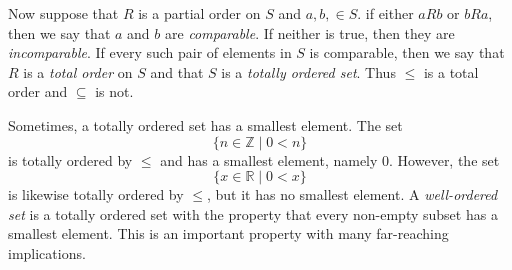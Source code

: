 \documentclass[12pt, letterpaper]{article}
\theoremstyle{definition}
\begin{document}
Now suppose that $R$ is a partial order on $S$ and $a, b, \in S$.
if either $aRb$ or $bRa$, then we say that $a$ and $b$ are \emph{comparable}.
If neither is true, then they are \emph{incomparable}. If every such pair
of elements in $S$ is comparable, then we say that $R$ is a \emph{total order}
on $S$ and that $S$ is a \emph{totally ordered set}. Thus $\leq$ is a total
order and $\subseteq$ is not.

Sometimes, a totally ordered set has a smallest element. The set
\begin{equation*}
    \{ n \in \mathbb{Z} \;|\; 0 < n \}
\end{equation*}
is totally ordered by $\leq$ and has a smallest element, namely 0. However,
the set
\begin{equation*}
    \{ x \in \mathbb{R} \;|\; 0 < x \}
\end{equation*}
is likewise totally ordered by $\leq$, but it has no smallest element.
A \emph{well-ordered set} is a totally ordered set with the property that
every non-empty subset has a smallest element. This is an important property
with many far-reaching implications.
\end{document}
